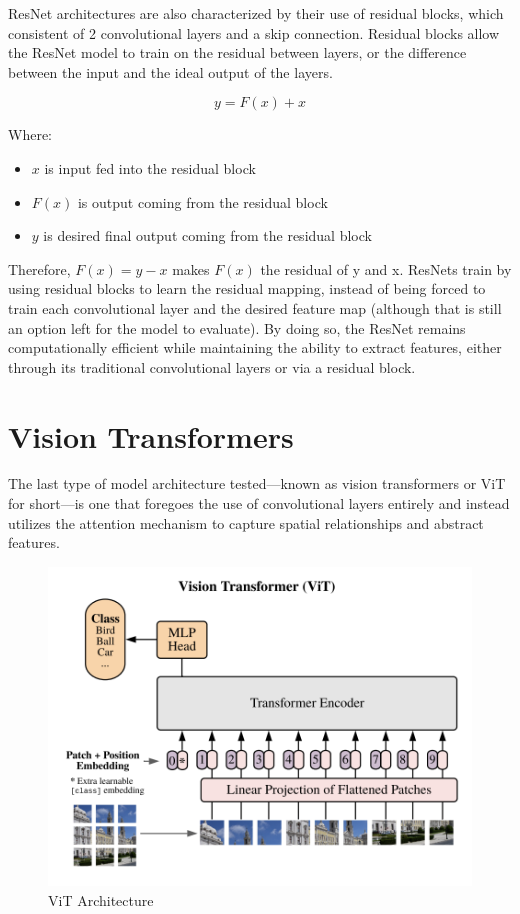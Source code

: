 \documentclass [MS] {uclathes}
\begin{document}
ResNet architectures are also characterized by their use of residual blocks, which consistent of 2 convolutional layers 
and a skip connection. Residual blocks allow the ResNet model to train on the residual between layers, or the difference 
between the input and the ideal output of the layers. 

\[y = F(x) + x\]

Where:
\begin{itemize}
    \item \(x\) is input fed into the residual block
    \item \(F(x)\) is output coming from the residual block
    \item \(y\) is desired final output coming from the residual block
\end{itemize}

Therefore, \(F(x) = y - x\) makes \(F(x)\) the residual of y and x. ResNets train by using residual blocks to learn the 
residual mapping, instead of being forced to train each convolutional layer and the desired feature map (although that 
is still an option left for the model to evaluate). By doing so, the ResNet remains computationally efficient while 
maintaining the ability to extract features, either through its traditional convolutional layers or via a residual 
block. 

\section{Vision Transformers}

The last type of model architecture tested---known as vision transformers or ViT for short---is one that foregoes the 
use of convolutional layers entirely and instead utilizes the attention mechanism to capture spatial relationships and 
abstract features. 

\begin{figure} [H]
    \centering
    \includegraphics[width=0.6\linewidth]{figures/ViT Architecture.png}
    \caption{ViT Architecture}
    \label{fig:ViT Architecture}
\end{figure}
\end{document}
